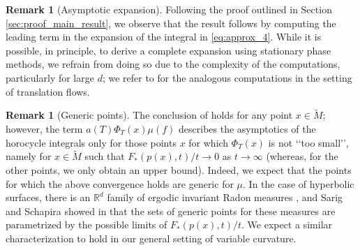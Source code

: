 \documentclass[11pt,letterpaper]{amsart}
\newcommand \R {{ \mathbb R}}
\newcommand \tM {{\widetilde M}}
\theoremstyle{definition}
\newtheorem{remark}[theorem]{Remark}
\begin{document}
\begin{remark}[Asymptotic expansion]\label{rk:asymptotic_expansion}
Following the proof outlined in Section \ref{sec:proof_main_result}, we observe that the result follows by computing the leading term in the expansion of the integral in \eqref{eq:approx_4}. While it is possible, in principle, to derive a complete expansion using stationary phase methods, we refrain from doing so due to the complexity of the computations, particularly for large $d$; we refer to \cite{BFRT} for the analogous computations in the setting of translation flows. %
\end{remark}



\begin{remark}[Generic points]
	The conclusion of  holds for any point $x\in \tM$; however, the term $a(T)\Phi_T(x) \mu(f)$ describes the asymptotics of the horocycle integrals only for those points $x$ for which $\Phi_T(x)$ is not \lq\lq too small\rq\rq, namely for $x\in \tM$ such that $F_{\ast}(p(x),t)/t \to 0$ as $t \to \infty$ (whereas, for the other points, we only obtain an upper bound). Indeed, we expect that the points for which the above convergence holds are generic for $\mu$. In the case of hyperbolic surfaces, there is an $\R^d$ family of ergodic invariant Radon measures \cite{BaLe, Sar}, and Sarig and Schapira showed in \cite{SaSc} that the sets of generic points for these measures are parametrized by the possible limits of $F_{\ast}(p(x),t)/t$. We expect a similar characterization to hold in our general setting of variable curvature.
\end{remark}
\end{document}
